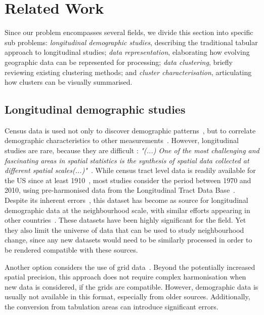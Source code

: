 \section{Related Work}
\label{sec:related}

Since our problem encompasses several fields, we divide this section into
specific sub problems: \emph{longitudinal demographic studies}, describing the
traditional tabular approach to longitudinal studies; \emph{data
representation}, elaborating how evolving geographic data can be represented for
processing; \emph{data clustering}, briefly reviewing existing clustering
methods; and \emph{cluster characterisation}, articulating how clusters can be
visually summarised.

\subsection{Longitudinal demographic studies}
Census data is used not only to discover demographic
patterns~\citep{Firebaugh2016}, but to correlate demographic characteristics to
other measurements~\citep{diez1997neighborhood}. However, longitudinal studies
are rare, because they are difficult : \emph{"(...) One of the most challenging
and fascinating areas in spatial statistics is the synthesis of spatial data
collected at different spatial scales(...)"}~\citep{gotway2002combining}. While
census tract level data is readily available for the US since at least
1910~\citep{nhgis}, most studies consider the period between 1970 and 2010,
using pre-harmonised data from the Longitudinal Tract Data
Base~\citep{Logan2014}. Despite its inherent
errors~\citep{Logan2016,Hallisey2017}, this dataset has become  as source for
longitudinal demographic data at the neighbourhood scale, with similar efforts
appearing in other countries~\citep{Liu2015,Lee2015,Allen2018}. These datasets
have been highly significant for the field. Yet they also limit the universe of
data that can be used to study neighbourhood change, since any new datasets
would need to be similarly processed in order to be rendered compatible with
these sources. 

Another option considers the use of grid
data~\citep{Dmowska2017,Dmowska2018,stepinski2019imperfect}. Beyond the
potentially increased spatial precision, this approach does not require complex
harmonisation when new data is considered, if the grids are compatible. However,
demographic data is usually not available in this format, especially from older
sources. Additionally, the conversion from tabulation areas can introduce
significant errors.

